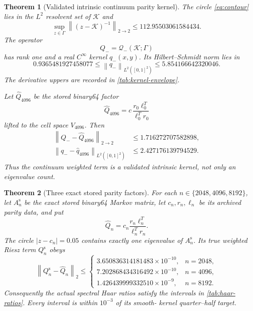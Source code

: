 \documentclass[11pt]{article}
\newtheorem{theorem}{Theorem}[section]
\theoremstyle{definition}
\theoremstyle{remark}
\newcommand{\cK}{\mathcal K}
\newcommand{\cQ}{\mathcal Q}
\newcommand{\norm}[1]{\left\lVert #1\right\rVert}
\begin{document}
\begin{theorem}[Validated intrinsic continuum parity kernel]
\label{thm:continuum-kernel}
The circle \eqref{eq:contour} lies in the $L^2$ resolvent set of $\cK$ and
\begin{equation}
 \sup_{z\in\Gamma}\norm{(z-\cK)^{-1}}_{2\to2}
 \le112.95503061584434.
 \label{eq:improved-continuum-resolvent}
\end{equation}
The operator
\[
 Q_-=\cQ_-(\cK;\Gamma)
\]
has rank one and a real $C^\infty$ kernel $q_-(x,y)$.  Its
Hilbert--Schmidt norm lies in
\[
 0.9365481927458077
 \le\norm{q_-}_{L^2([0,1]^2)}
 \le5.854166642320046.
\]
The derivative uppers are recorded in \cref{tab:kernel-envelope}.

Let $\widehat Q_{4096}$ be the stored binary64 factor
\[
 \widehat Q_{4096}
 =c\,\frac{r_0\ell_0^T}{\ell_0^Tr_0}
\]
lifted to the cell space $V_{4096}$.  Then
\begin{align}
 \norm{Q_- -\widehat Q_{4096}}_{2\to2}
 &\le1.716272707582898,
 \label{eq:construction-operator-ball}\\
 \norm{q_- -\widehat q_{4096}}_{L^2([0,1]^2)}
 &\le2.427176139794529.
 \label{eq:construction-kernel-ball}
\end{align}
Thus the continuum weighted term is a validated intrinsic kernel, not only
an eigenvalue count.
\end{theorem}

\begin{theorem}[Three exact stored parity factors]
\label{thm:stored-factors}
For each $n\in\{2048,4096,8192\}$, let $A_n^{\mathrm s}$ be the exact stored
binary64 Markov matrix, let $c_n,r_n,\ell_n$ be its archived parity data, and
put
\[
 \widehat Q_n=c_n\frac{r_n\ell_n^T}{\ell_n^Tr_n}.
\]
The circle $|z-c_n|=0.05$ contains exactly one eigenvalue of
$A_n^{\mathrm s}$.  Its true weighted Riesz term $Q_n^{\mathrm s}$ obeys
\[
 \norm{Q_n^{\mathrm s}-\widehat Q_n}_2
 \le
 \begin{cases}
  3.650836314181483\times10^{-10},&n=2048,\\
  7.202868434316492\times10^{-10},&n=4096,\\
  1.426439999332510\times10^{-9},&n=8192.
 \end{cases}
\]
Consequently the actual spectral Haar ratios satisfy the intervals in
\cref{tab:haar-ratios}.  Every interval is within $10^{-3}$ of its smooth-
kernel quarter--half target.
\end{theorem}
\end{document}
